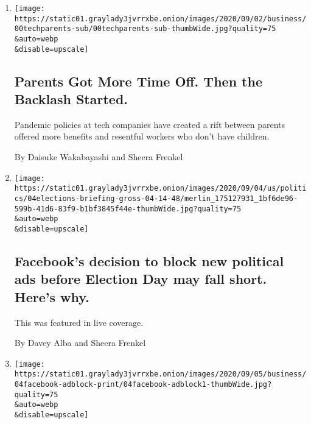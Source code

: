 \begin{enumerate}
\def\labelenumi{\arabic{enumi}.}
\item
  \href{/2020/09/05/technology/parents-time-off-backlash.html}{}

  \texttt{[image: https://static01.graylady3jvrrxbe.onion/images/2020/09/02/business/00techparents-sub/00techparents-sub-thumbWide.jpg?quality=75\\\&auto=webp\\\&disable=upscale]}

  \hypertarget{parents-got-more-time-off-then-the-backlash-started}{%
  \subsection{Parents Got More Time Off. Then the Backlash
  Started.}\label{parents-got-more-time-off-then-the-backlash-started}}

  Pandemic policies at tech companies have created a rift between
  parents offered more benefits and resentful workers who don't have
  children.

  By Daisuke Wakabayashi and Sheera Frenkel
\item
  \href{/live/2020/09/04/us/trump-vs-biden/facebooks-decision-to-block-new-political-ads-before-election-day-may-fall-short-heres-why}{}

  \texttt{[image: https://static01.graylady3jvrrxbe.onion/images/2020/09/04/us/politics/04elections-briefing-gross-04-14-48/merlin\_175127931\_1bf6de96-599b-41d6-83f9-b1bf3845f44e-thumbWide.jpg?quality=75\\\&auto=webp\\\&disable=upscale]}

  \hypertarget{facebooks-decision-to-block-new-political-ads-before-election-day-may-fall-short-heres-why}{%
  \subsection{Facebook's decision to block new political ads before
  Election Day may fall short. Here's
  why.}\label{facebooks-decision-to-block-new-political-ads-before-election-day-may-fall-short-heres-why}}

  This was featured in live coverage.

  By Davey Alba and Sheera Frenkel
\item
  \href{/2020/09/04/technology/facebooks-political-ads-block-election.html}{}

  \texttt{[image: https://static01.graylady3jvrrxbe.onion/images/2020/09/05/business/04facebook-adblock-print/04facebook-adblock1-thumbWide.jpg?quality=75\\\&auto=webp\\\&disable=upscale]}


\end{enumerate}
